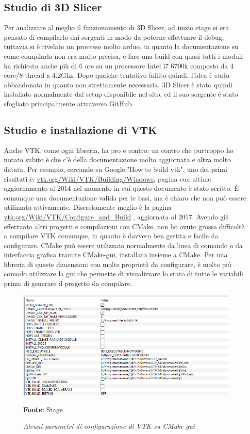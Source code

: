\subsection{Studio di 3D Slicer}
Per analizzare al meglio il funzionamento di 3D Slicer, ad inizio stage si era pensato di compilarlo dai sorgenti in modo da poterne effettuare il debug, tuttavia si è rivelato un processo molto arduo, in quanto la documentazione su come compilarlo non era molto precisa, e fare una build con quasi tutti i moduli ha richiesto anche più di 6 ore su un processore Intel i7 6700k composto da 4 core/8 thread a 4.2Ghz. Dopo qualche tentativo fallito quindi, l'idea è stata abbandonata in quanto non strettamente necessaria. 3D Slicer è stato quindi installato normalmente dal setup disponibile nel sito, ed il suo sorgente è stato sfogliato principalmente attraverso GitHub.

\subsection{Studio e installazione di VTK}
Anche VTK, come ogni libreria, ha pro e contro: un contro che purtroppo ho notato subito è che c'è della documentazione molto aggiornata e altra molto datata. Per esempio, cercando su Google:"How to build vtk", uno dei primi risultati è: \href{https://vtk.org/Wiki/VTK/Building/Windows}{vtk.org/Wiki/VTK/Building/Windows}, pagina con ultimo aggiornamento al 2014 nel momento in cui questo documento è stato scritto. \'E comunque una documentazione valida per le basi, ma è chiaro che non può essere utilizzata attivamente. Discretamente meglio è la pagina \href{https://vtk.org/Wiki/VTK/Configure_and_Build}{vtk.org/Wiki/VTK/Configure\_and\_Build} , aggiornata al 2017. Avendo già effettuato altri progetti e compilazioni con CMake, non ho avuto grossa difficoltà a compilare VTK comunque, in quanto è davvero ben gestita e facile da configurare. CMake può essere utilizzato normalmente da linea di comando o da interfaccia grafica tramite CMake-gui, installato insieme a CMake. Per una libreria di queste dimensioni con molte proprietà da configurare, è molto più comodo utilizzare la gui che permette di visualizzare lo stato di tutte le variabili prima di generare il progetto da compilare.

\begin{figure}[h]
    \centering
    \includegraphics[width=1\textwidth]{immagini/svolgimento/vtkcmake.png}
    \caption{\textit{Alcuni parametri di configurazione di VTK su CMake-gui}}
    \textbf{Fonte}: Stage
    \label{fig: VTK CMAKE}
\end{figure}

